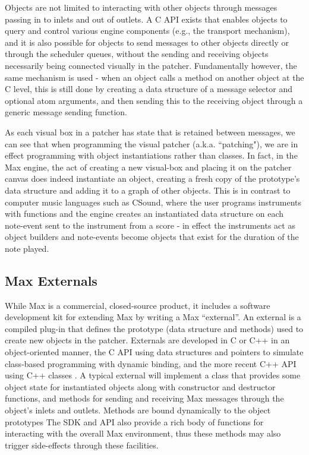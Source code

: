 \documentclass[acmsmall]{acmart}
\begin{document}

Objects are not limited to interacting with other objects through messages passing in to inlets and out of 
outlets. A C API exists that enables objects to query and control various engine components (e.g., 
the transport mechanism), and it is also possible for objects to send messages to other objects 
directly or through the scheduler queues, without the sending and receiving objects 
necessarily being connected visually in the patcher. Fundamentally however, the same mechanism
is used - when an object calls a method on another object at the C level, this is still done
by creating a data structure of a message selector and optional atom arguments, 
and then sending this to the receiving object through a generic message sending function.

As each visual box in a patcher has state that is retained between messages, we can see that when
programming the visual patcher (a.k.a. ``patching"), we are in effect programming with
object instantiations rather than classes. In fact, in the Max engine, the act of creating
a new visual-box and placing it on the patcher canvas does indeed instantiate an object, creating
a fresh copy of the prototype's data structure and adding it to a graph of other objects.
This is in contrast to computer music languages such as CSound, where the user programs instruments 
with functions and the engine creates an instantiated data structure on each note-event sent to 
the instrument from a score - in effect the instruments act as object builders and note-events 
become objects that exist for the duration of the note played.



\subsection{Max Externals}

While Max is a commercial, closed-source product, it includes a software development kit for 
extending Max by writing a Max “external”. An external is a compiled plug-in that defines the  
prototype (data structure and methods) used to create new objects in the patcher.  
Externals are developed in C or C++ in an object-oriented manner, the C API using data 
structures and pointers to simulate class-based programming with dynamic binding,
and the more recent C++ API using C++ classes \cite{Zicarelli2002}.
A typical external will implement a class that provides some object state for instantiated
objects along with constructor and destructor functions, and  
methods for sending and receiving Max messages through the object’s inlets and outlets.
Methods are bound dynamically to the object prototypes
The SDK and API also provide a rich body of functions for interacting with the overall Max
environment, thus these methods may also trigger side-effects through these facilities.
\end{document}
